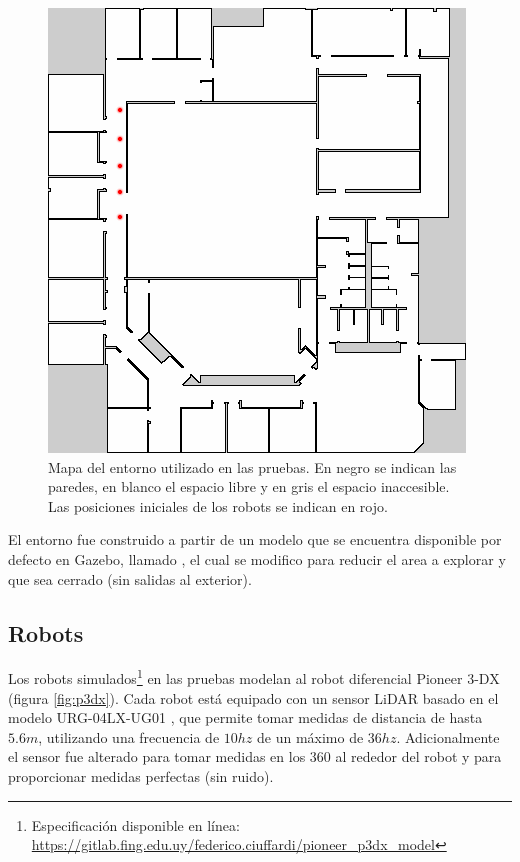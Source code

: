 \begin{figure}[H]
  \center
  \includegraphics[width=0.5\linewidth]{imagenes/willow/0_250000mRobots2.png}
  \caption[Mapa del entorno utilizado en las pruebas.]{Mapa del entorno utilizado en las pruebas. En negro se indican las paredes, en blanco el espacio libre y en gris el espacio inaccesible. Las posiciones iniciales de los robots se indican en rojo.}
  \label{fig:willow}
\end{figure} 

El entorno fue construido a partir de un modelo que se encuentra disponible por
defecto en Gazebo, llamado , el cual se modifico para
reducir el area a explorar y que sea cerrado (sin salidas al exterior).

\subsection{Robots}
Los robots simulados\footnote{Especificación disponible en línea:\\
\url{https://gitlab.fing.edu.uy/federico.ciuffardi/pioneer_p3dx_model}} en las
pruebas modelan al robot diferencial Pioneer 3-DX \cite{p3dx} (figura
\ref{fig:p3dx}). Cada robot está equipado con un sensor \gls{LiDAR} basado en el
modelo URG-04LX-UG01 \cite{hokuyo}, que permite tomar medidas de distancia de
hasta $5.6m$, utilizando una frecuencia de $10hz$ de un máximo de $36hz$.
Adicionalmente el sensor fue alterado para tomar medidas en los $360$\textdegree
al rededor del robot y para proporcionar medidas perfectas (sin ruido).

